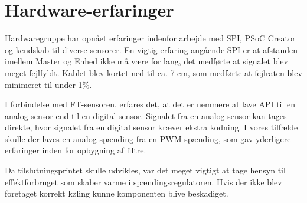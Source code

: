 \section{Hardware-erfaringer}

Hardwaregruppe har opnået erfaringer indenfor arbejde med SPI, PSoC Creator og kendskab til diverse sensorer. En vigtig erfaring angående SPI er at afstanden imellem Master og Enhed ikke må være for lang, det medførte at signalet blev meget fejlfyldt. Kablet blev kortet ned til ca. 7 cm, som medførte at fejlraten blev minimeret til under 1\%.

I forbindelse med FT-sensoren, erfares det, at det er nemmere at lave API til en analog sensor end til en digital sensor. Signalet fra en analog sensor kan tages direkte, hvor signalet fra en digital sensor kræver ekstra kodning. I vores tilfælde skulle der laves en analog spænding fra en PWM-spænding, som gav yderligere erfaringer inden for opbygning af filtre. 

Da tilslutningsprintet skulle udvikles, var det meget vigtigt at tage hensyn til effektforbruget som skaber varme i spændingsregulatoren. Hvis der ikke blev foretaget korrekt køling kunne komponenten blive beskadiget.  
